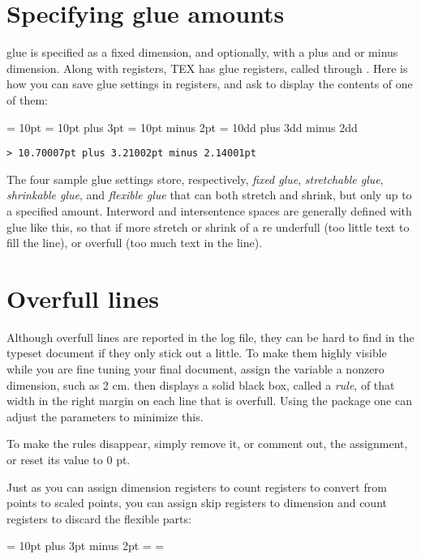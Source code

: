 \section{Specifying glue amounts}

\tex glue is specified as a fixed dimension, and optionally, with a plus and
or minus dimension. Along with  registers, TEX has glue registers,
called  through . Here is how you can save glue settings in
\tex registers, and ask \tex to display the contents of one of them:

\begin{teX}
 = 10pt
 = 10pt plus 3pt
 = 10pt minus 2pt
 = 10dd plus 3dd minus 2dd
\the {}
\end{teX}


\texttt{> 10.70007pt plus 3.21002pt minus 2.14001pt}

The four sample glue settings store, respectively, {\em fixed glue}, {\em  stretchable
glue}, {\em shrinkable glue}, and {\em flexible glue}  that can both stretch and shrink,
but only up to a specified amount. Interword and intersentence spaces are
generally defined with glue like this, so that if more stretch or shrink of  a
re underfull (too little text to fill the line), or overfull (too much text in the
line).



\section{Overfull lines}

Although overfull lines are reported in the \tex log file, they can be hard
to find in the typeset document if they only stick out a little. To make
them highly visible while you are fine tuning your final document, assign
the variable  a nonzero dimension, such as 2 cm. \tex then
displays a solid black box, called a \emph{rule}, of that width in the right margin
on each line that is overfull. Using the  package one can adjust the parameters to minimize this.

To make the rules disappear, simply remove it,
or comment out, the assignment, or reset its value to 0 pt. 

Just as you can assign dimension registers to count registers to convert
from points to scaled points, you can assign skip registers to dimension and
count registers to discard the flexible parts:


\begin{teX}
 = 10pt plus 3pt minus 2pt
\the{}
  = 
\the {}
 = 
\the {}
\end{teX}




